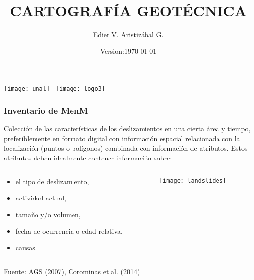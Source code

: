 \documentclass[12pt]{beamer}
\title[Inventario]{CARTOGRAFÍA GEOTÉCNICA}
\author[Edier Aristizábal]{Edier V. Aristizábal G.}
\institute{\emph{evaristizabalg@unal.edu.co}}
\date{Version:\today}
\begin{document}
\begin{frame}
\titlepage
\centering
	\texttt{[image: unal]}\hspace*{4.75cm}~%
   	\texttt{[image: logo3]} 
\end{frame}
\begin{frame}
\frametitle{Inventario de MenM}
\justifying
\scriptsize{Colección de las características de los deslizamientos en una cierta área y tiempo, preferiblemente en formato digital con información espacial relacionada con la localización (puntos o polígonos) combinada con información de atributos. Estos atributos deben idealmente contener información sobre:}
\begin{columns}
\begin{column}{0.45\linewidth}
\begin{itemize}
\item el tipo de deslizamiento, 
\item actividad actual,
\item tamaño y/o volumen, 
\item fecha de ocurrencia o edad relativa, 
\item causas. 
\end{itemize}
\end{column}
\begin{column}{0.55\linewidth}
\begin{figure}
   	\texttt{[image: landslides]}
\end{figure}
\end{column}
\end{columns}
\tiny{Fuente: AGS (2007), Corominas et al. (2014)}
\end{frame}
\end{document}
